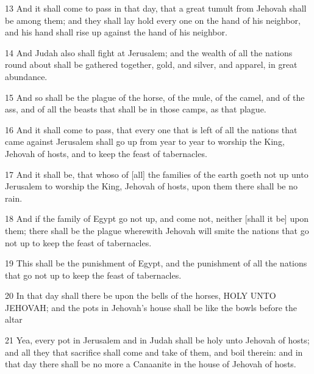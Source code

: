 \par 13 And it shall come to pass in that day, that a great tumult from Jehovah shall be among them; and they shall lay hold every one on the hand of his neighbor, and his hand shall rise up against the hand of his neighbor.
\par 14 And Judah also shall fight at Jerusalem; and the wealth of all the nations round about shall be gathered together, gold, and silver, and apparel, in great abundance.
\par 15 And so shall be the plague of the horse, of the mule, of the camel, and of the ass, and of all the beasts that shall be in those camps, as that plague.
\par 16 And it shall come to pass, that every one that is left of all the nations that came against Jerusalem shall go up from year to year to worship the King, Jehovah of hosts, and to keep the feast of tabernacles.
\par 17 And it shall be, that whoso of [all] the families of the earth goeth not up unto Jerusalem to worship the King, Jehovah of hosts, upon them there shall be no rain.
\par 18 And if the family of Egypt go not up, and come not, neither [shall it be] upon them; there shall be the plague wherewith Jehovah will smite the nations that go not up to keep the feast of tabernacles.
\par 19 This shall be the punishment of Egypt, and the punishment of all the nations that go not up to keep the feast of tabernacles.
\par 20 In that day shall there be upon the bells of the horses, HOLY UNTO JEHOVAH; and the pots in Jehovah's house shall be like the bowls before the altar
\par 21 Yea, every pot in Jerusalem and in Judah shall be holy unto Jehovah of hosts; and all they that sacrifice shall come and take of them, and boil therein: and in that day there shall be no more a Canaanite in the house of Jehovah of hosts.

